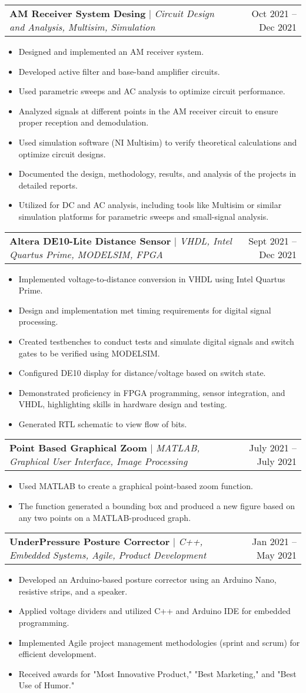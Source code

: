 \documentclass[A4,10pt]{article}
\makeatletter
\newcommand{\resumeItem}[1]{
  \item\small{
    {#1 \vspace{-2pt}}
  }
}
\newcommand{\resumeProjectHeading}[2]{
    \item
    \begin{tabular*}{0.97\textwidth}{l@{\extracolsep{\fill}}r}
      \small#1 & #2 \\
    \end{tabular*}\vspace{-7pt}
}
\newcommand{\resumeItemListStart}{\begin{itemize}}
\newcommand{\resumeItemListEnd}{\end{itemize}\vspace{-5pt}}
\makeatother
\begin{document}
        \resumeProjectHeading
        {\textbf{AM Receiver System Desing} $|$ \emph{Circuit Design and Analysis, Multisim, Simulation}}{Oct 2021 -- Dec 2021}
        \resumeItemListStart
          \resumeItem{Designed and implemented an AM receiver system.}
          \resumeItem{Developed active filter and base-band amplifier circuits.}
          \resumeItem{Used parametric sweeps and AC analysis to optimize circuit performance.}
          \resumeItem{Analyzed signals at different points in the AM receiver circuit to ensure proper reception and demodulation.}
          \resumeItem{Used simulation software (NI Multisim) to verify theoretical calculations and optimize circuit designs.}
          \resumeItem{Documented the design, methodology, results, and analysis of the projects in detailed reports.}
          \resumeItem{Utilized for DC and AC analysis, including tools like Multisim or similar simulation platforms for parametric sweeps and small-signal analysis.}
        \resumeItemListEnd
  
        \resumeProjectHeading
        {\textbf{Altera DE10-Lite Distance Sensor} $|$ \emph{VHDL, Intel Quartus Prime, MODELSIM, FPGA}}{Sept 2021 -- Dec 2021}
        \resumeItemListStart
          \resumeItem{Implemented voltage-to-distance conversion in VHDL using Intel Quartus Prime.}
          \resumeItem{Design and implementation met timing requirements for digital signal processing.}
          \resumeItem{Created testbenches to conduct tests and simulate digital signals and switch gates to be verified using MODELSIM.}
          \resumeItem{Configured DE10 display for distance/voltage based on switch state.}
          \resumeItem{Demonstrated proficiency in FPGA programming, sensor integration, and VHDL, highlighting skills in hardware design and testing.}
          \resumeItem{Generated RTL schematic to view flow of bits.}
        \resumeItemListEnd
        
        \resumeProjectHeading
        {\textbf{Point Based Graphical Zoom} $|$ \emph{MATLAB, Graphical User Interface, Image Processing}}{July 2021 -- July 2021}
        \resumeItemListStart
          \resumeItem{Used MATLAB to create a graphical point-based zoom function.}
          \resumeItem{The function generated a bounding box and produced a new figure based on any two points on a MATLAB-produced graph.}
        \resumeItemListEnd

        \resumeProjectHeading
        {\textbf{UnderPressure Posture Corrector} $|$ \emph{C++, Embedded Systems, Agile, Product Development}}{Jan 2021 -- May 2021}
        \resumeItemListStart
          \resumeItem{Developed an Arduino-based posture corrector using an Arduino Nano, resistive strips, and a speaker.}
          \resumeItem{Applied voltage dividers and utilized C++ and Arduino IDE for embedded programming.}
          \resumeItem{Implemented Agile project management methodologies (sprint and scrum) for efficient development.}
          \resumeItem{Received awards for "Most Innovative Product," "Best Marketing," and "Best Use of Humor."}
        \resumeItemListEnd
\end{document}
